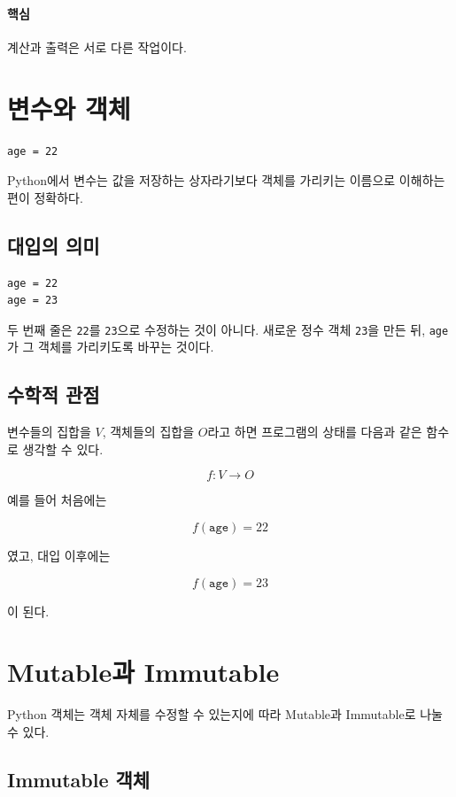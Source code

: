 \documentclass[11pt,a4paper]{article}
\begin{document}
\paragraph{핵심}
계산과 출력은 서로 다른 작업이다.

\section{변수와 객체}

\begin{lstlisting}
age = 22
\end{lstlisting}

Python에서 변수는 값을 저장하는 상자라기보다 객체를 가리키는 이름으로 이해하는 편이 정확하다.

\subsection{대입의 의미}

\begin{lstlisting}
age = 22
age = 23
\end{lstlisting}

두 번째 줄은 \texttt{22}를 \texttt{23}으로 수정하는 것이 아니다. 새로운 정수 객체 \texttt{23}을 만든 뒤, \texttt{age}가 그 객체를 가리키도록 바꾸는 것이다.

\subsection{수학적 관점}

변수들의 집합을 \(V\), 객체들의 집합을 \(O\)라고 하면 프로그램의 상태를 다음과 같은 함수로 생각할 수 있다.

\[
f:V\rightarrow O
\]

예를 들어 처음에는

\[
f(\texttt{age})=22
\]

였고, 대입 이후에는

\[
f(\texttt{age})=23
\]

이 된다.

\section{Mutable과 Immutable}

Python 객체는 객체 자체를 수정할 수 있는지에 따라 Mutable과 Immutable로 나눌 수 있다.

\subsection{Immutable 객체}
\end{document}
